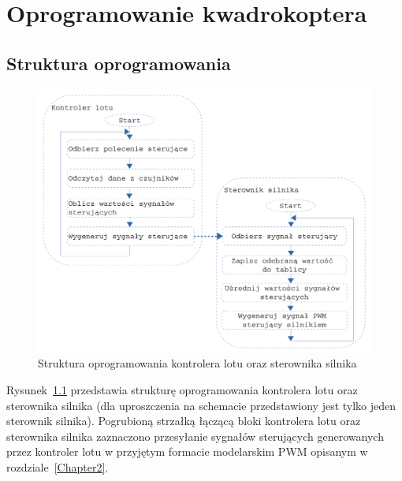 
\chapter{Oprogramowanie kwadrokoptera} %

\label{Chapter6} %


\section{Struktura oprogramowania}

\begin{figure}[H]
	\centering
	\includegraphics[width=1\textwidth]{Pictures/Struktura_oprogramowania.png}
		\caption[Struktura oprogramowania kontrolera lotu oraz sterownika silnika]{Struktura oprogramowania kontrolera lotu oraz sterownika silnika}
	\label{fig:struktura_oprogramowania}
\end{figure}

Rysunek~\ref{fig:struktura_oprogramowania} przedstawia strukturę oprogramowania kontrolera lotu oraz sterownika silnika (dla uproszczenia na schemacie przedstawiony jest tylko jeden sterownik silnika). Pogrubioną strzałką łączącą bloki kontrolera lotu oraz sterownika silnika zaznaczono przesyłanie sygnałów sterujących generowanych przez kontroler lotu w przyjętym formacie modelarskim PWM opisanym w rozdziale~\ref{Chapter2}.

